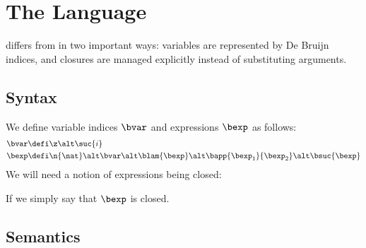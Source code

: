 \section{The \textnormal{\blang} Language}

\blang differs from \hlang in two important ways: variables are represented by De Bruijn indices, and closures are managed explicitly instead of substituting arguments.


\subsection{Syntax}

We define variable indices $\bvar$ and \blang expressions $\bexp$ as follows:
\begin{align*}
	\bvar &\defi \z \alt \suc{i} \\
	\bexp &\defi \n{\nat} \alt \bvar \alt \blam{\bexp} \alt \bapp{\bexp_1}{\bexp_2} \alt \bsuc{\bexp}
\end{align*}
We will need a notion of \blang expressions being closed:



\begin{judgement}{}

\begin{prooftree}
\end{prooftree}

\begin{prooftree}
\end{prooftree}

\begin{prooftree}
\end{prooftree}

\begin{prooftree}
\end{prooftree}

\begin{prooftree}
\end{prooftree}

\end{judgement}

If  we simply say that $\bexp$ is closed.

\subsection{Semantics}

